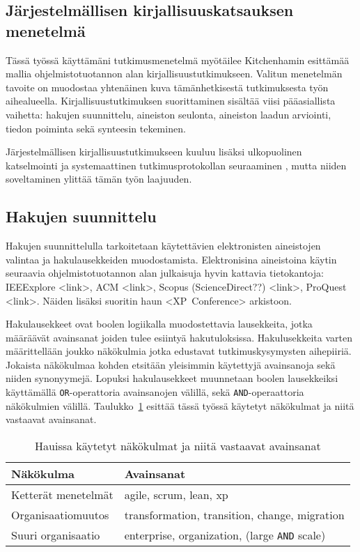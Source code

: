 \subsection{Järjestelmällisen kirjallisuuskatsauksen menetelmä}

Tässä työssä käyttämäni tutkimusmenetelmä myötäilee Kitchenhamin esittämää
mallia ohjelmistotuotannon alan kirjallisuustutkimukseen. Valitun menetelmän
tavoite on muodostaa yhtenäinen kuva tämänhetkisestä tutkimuksesta työn
aihealueella. Kirjallisuustutkimuksen suorittaminen sisältää viisi pääasiallista
vaihetta: hakujen suunnittelu, aineiston seulonta, aineiston laadun arviointi,
tiedon poiminta sekä synteesin tekeminen. \citep{Kitchenham2007}

Järjestelmällisen kirjallisuustutkimukseen kuuluu lisäksi ulkopuolinen
katselmointi ja systemaattinen tutkimusprotokollan seuraaminen
\citep{Kitchenham2007}, mutta niiden soveltaminen ylittää tämän työn laajuuden.

\subsection{Hakujen suunnittelu}
Hakujen suunnittelulla tarkoitetaan käytettävien elektronisten aineistojen
valintaa ja hakulausekkeiden muodostamista. Elektronisina aineistoina käytin
seuraavia ohjelmistotuotannon alan julkaisuja hyvin kattavia tietokantoja:
IEEExplore <link>, ACM <link>, Scopus (ScienceDirect??) <link>, ProQuest <link>.
Näiden lisäksi suoritin haun <XP~Conference> arkistoon.

Hakulausekkeet ovat boolen logiikalla muodostettavia lausekkeita, jotka
määräävät avainsanat joiden tulee esiintyä hakutuloksissa. Hakulusekkeita varten
määrittellään joukko näkökulmia jotka edustavat tutkimuskysymysten aihepiiriä.
Jokaista näkökulmaa kohden etsitään yleisimmin käytettyjä avainsanoja sekä
niiden synonyymejä. Lopuksi hakulausekkeet muunnetaan boolen lausekkeiksi
käyttämällä \texttt{OR}-operattoria avainsanojen välillä, sekä
\texttt{AND}-operaattoria näkökulmien välillä.
Taulukko~\ref{table:hakulausekkeet} esittää tässä työssä käytetyt näkökulmat ja
niitä vastaavat avainsanat.

\begin{table}
    \begin{tabular}{|l|l|}
        \hline
        Näkökulma           & Avainsanat   \\ \hline
        Ketterät menetelmät & agile, scrum, lean, xp \\ 
        Organisaatiomuutos  & transformation, transition, change, migration \\
        Suuri organisaatio  & enterprise, organization, (large \texttt{AND} scale) \\
        \hline
    \end{tabular}
	\caption{Hauissa käytetyt näkökulmat ja niitä vastaavat avainsanat}
	\label{table:hakulausekkeet}
\end{table}

